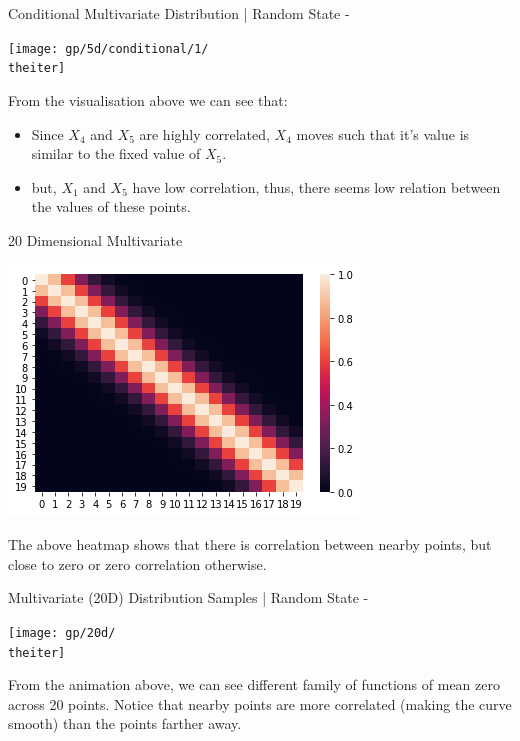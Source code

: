 \documentclass{beamer}
\begin{document}
%
{%
	\begin{frame}{Conditional Multivariate Distribution | Random State - \theiter}
		\begin{center}
			\texttt{[image: gp/5d/conditional/1/\\theiter]}
		\end{center}
		From the visualisation above we can see that:
		\begin{itemize}
			\item Since $X_4$ and $X_5$ are highly correlated, $X_4$ moves such that it's value is similar to the fixed value of $X_5$.
			\item but, $X_1$ and $X_5$ have low correlation, thus, there seems low relation between the values of these points.
		\end{itemize}
	\end{frame}
}

\begin{frame}{20 Dimensional Multivariate}
	\begin{center}
		\includegraphics[width=\linewidth, height=\textheight -120pt ,keepaspectratio]{gp/20d}\\
	\end{center}	
	The above heatmap shows that there is correlation between nearby points, but close to zero or zero correlation otherwise.
\end{frame}

%
{%
	\begin{frame}{Multivariate (20D) Distribution Samples | Random State - \theiter}
		\begin{center}
			\texttt{[image: gp/20d/\\theiter]}
		\end{center}
		From the animation above, we can see different family of functions of mean zero across 20 points. Notice that nearby points are more correlated (making the curve smooth) than the points farther away.
	\end{frame}
}
\end{document}
